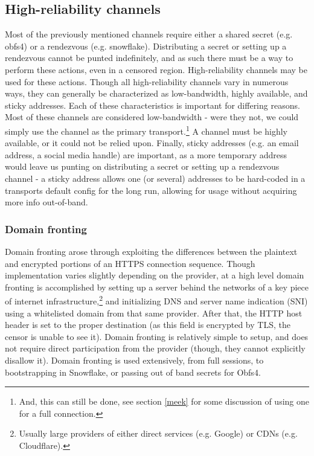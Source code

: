 \documentclass[12pt]{report}
\begin{document}
\subsection{High-reliability channels}

Most of the previously mentioned channels require either a shared secret (e.g. obfs4) or a rendezvous (e.g. snowflake). Distributing a secret or setting up a rendezvous cannot be punted indefinitely, and as such there must be a way to perform these actions, even in a censored region. High-reliability channels may be used for these actions. Though all high-reliability channels vary in numerous ways, they can generally be characterized as low-bandwidth, highly available, and sticky addresses. Each of these characteristics is important for differing reasons. Most of these channels are considered low-bandwidth - were they not, we could simply use the channel as the primary transport.\footnote{And, this can still be done, see section \ref{meek} for some discussion of using one for a full connection.} A channel must be highly available, or it could not be relied upon. Finally, sticky addresses (e.g. an email address, a social media handle) are important, as a more temporary address would leave us punting on distributing a secret or setting up a rendezvous channel - a sticky address allows one (or several) addresses to be hard-coded in a transports default config for the long run, allowing for usage without acquiring more info out-of-band.

\subsubsection{Domain fronting}
\label{domain fronting}

Domain fronting arose through exploiting the differences between the plaintext and encrypted portions of an HTTPS connection sequence. Though implementation varies slightly depending on the provider, at a high level domain fronting is accomplished by setting up a server behind the networks of a key piece of internet infrastructure,\footnote{Usually large providers of either direct services (e.g. Google) or CDNs (e.g. Cloudflare).} and initializing DNS and server name indication (SNI) using a whitelisted domain from that same provider. After that, the HTTP host header is set to the proper destination (as this field is encrypted by TLS, the censor is unable to see it). Domain fronting is relatively simple to setup, and does not require direct participation from the provider (though, they cannot explicitly disallow it).\cite{domain fronting} Domain fronting is used extensively, from full sessions,\cite{meek} to bootstrapping in Snowflake, or passing out of band secrets for Obfs4.
\end{document}

